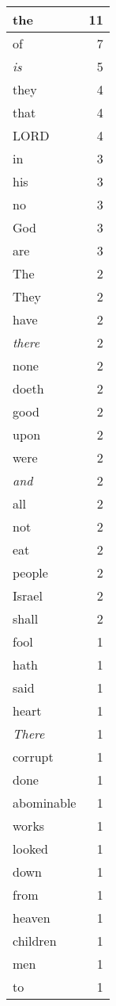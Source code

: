 \begin{center}
\begin{longtable}{l|r}
\hline \hline
\endlastfoot
the & 11 \\ \hline
of & 7 \\ \hline
\emph{is} & 5 \\ \hline
they & 4 \\ \hline
that & 4 \\ \hline
LORD & 4 \\ \hline
in & 3 \\ \hline
his & 3 \\ \hline
no & 3 \\ \hline
God & 3 \\ \hline
are & 3 \\ \hline
The & 2 \\ \hline
They & 2 \\ \hline
have & 2 \\ \hline
\emph{there} & 2 \\ \hline
none & 2 \\ \hline
doeth & 2 \\ \hline
good & 2 \\ \hline
upon & 2 \\ \hline
were & 2 \\ \hline
\emph{and} & 2 \\ \hline
all & 2 \\ \hline
not & 2 \\ \hline
eat & 2 \\ \hline
people & 2 \\ \hline
Israel & 2 \\ \hline
shall & 2 \\ \hline
fool & 1 \\ \hline
hath & 1 \\ \hline
said & 1 \\ \hline
heart & 1 \\ \hline
\emph{There} & 1 \\ \hline
corrupt & 1 \\ \hline
done & 1 \\ \hline
abominable & 1 \\ \hline
works & 1 \\ \hline
looked & 1 \\ \hline
down & 1 \\ \hline
from & 1 \\ \hline
heaven & 1 \\ \hline
children & 1 \\ \hline
men & 1 \\ \hline
to & 1 \\ \hline

\end{longtable}
\end{center}
